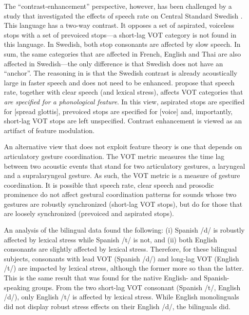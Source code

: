 \documentclass[a4paper]{article}
\begin{document}
The ``contrast-enhancement'' perspective, however, has been challenged by a study that investigated the effects of speech rate on Central Standard Swedish \cite{beckman2011rate}. This language has a two-way contrast. It opposes a set of aspirated, voiceless stops with a set of prevoiced stops---a short-lag VOT category is not found in this language. In Swedish, both stop consonants are affected by slow speech. In sum, the same categories that are affected in French, English and Thai are also affected in Swedish---the only difference is that Swedish does not have an ``anchor''. The reasoning in \cite{beckman2011rate} is that the Swedish contrast is already acoustically large in faster speech and does not need to be enhanced. \cite{beckman2011rate} propose that speech rate, together with clear speech (and lexical stress), affects VOT categories that \emph{are specified for a phonological feature}. In this view, aspirated stops are specified for [spread glottis], prevoiced stops are specified for [voice] and, importantly, short-lag VOT stops are left unspecified. Contrast enhancement is viewed as an artifact of feature modulation.

An alternative view that does not exploit feature theory is one that depends on articulatory gesture coordination. The VOT metric measures the time lag between two acoustic events that stand for two articulatory gestures, a laryngeal and a supralaryngeal gesture. As such, the VOT metric is a measure of gesture coordination. It is possible that speech rate, clear speech and prosodic prominence do not affect gestural coordination patterns for sounds whose two gestures are robustly synchronized (short-lag VOT stops), but do for those that are loosely synchronized (prevoiced and aspirated stops).

An analysis of the bilingual data found the following: (i) Spanish /d/ is robustly affected by lexical stress while Spanish /t/ is not, and (ii) both English consonants are slightly affected by lexical stress. Therefore, for these bilingual subjects, consonants with lead VOT (Spanish /d/) and long-lag VOT (English /t/) are impacted by lexical stress, although the former more so than the latter. This is the same result that was found for the native English- and Spanish-speaking groups. From the two short-lag VOT consonant (Spanish /t/, English /d/), only English /t/ is affected by lexical stress. While English monolinguals did not display robust stress effects on their English /d/, the bilinguals did.
\end{document}
